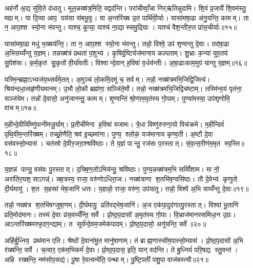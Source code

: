 अह॑र्नो अ॒द्य सु॑वि॒ते द॑धातु। मूल॒न्नख्ष॑त्र॒मिति॒ यद्वद॑न्ति। परा॑चीव्वाँ॒चा निर्‌ऋ॑तिन्नुदामि। शि॒वं प्र॒जायै॑ शि॒वम॑स्तु॒ मह्यम्। या दि॒व्या आप॒ पय॑सा संबभू॒वुः। या अ॒न्तरि॑ख्ष उ॒त पार्थि॑वी॒र्याः। यासा॑मषा॒ढा अ॑नु॒यन्ति॒ कामम्। ता न॒ आप॒श्श स्यो॒ना भ॑वन्तु। याश्च॒ कूप्या॒ याश्च॑ ना॒द्यास्समु॒द्रियाः। याश्च॑ वैश॒न्तीरु॒त प्रा॑स॒चीर्याः॥१५॥

यासा॑मषा॒ढा मधु॑ भ॒ख्षय॑न्ति॒। ता न॒ आप॒श्श स्यो॒ना भ॑वन्तु। तन्नो॒ विश्वे॒ उप॑ शृण्वन्तु दे॒वाः। तद॑षा॒ढा अ॒भिसय्यँ॑न्तु य॒ज्ञम्। तन्नख्ष॑त्रं प्रथतां प॒शुभ्य॑। कृ॒षिर्वृ॒ष्टिर्यज॑मानाय कल्पताम्। शु॒भ्राः क॒न्या॑ युव॒तय॑ सु॒पेश॑सः। क॒र्म॒कृत॑ सु॒कृतो॑ वी॒र्या॑वतीः। विश्वान्दे॒वान् ह॒विषा॑ व॒र्धय॑न्तीः। अ॒षा॒ढाःकाम॒मुप॑ यान्तु य॒ज्ञम्॥१६॥

यस्मि॒न्ब्रह्मा॒ऽभ्यज॑य॒थ्सर्व॑मे॒तत्। अ॒मुञ्च॑ लो॒कमि॒दमू॑ च॒ सर्वम्। तन्नो॒ नख्ष॑त्रमभि॒जिद्वि॒जित्य॑। श्रिय॑न्दधा॒त्वहृ॑णीयमानम्। उ॒भौ लो॒कौ ब्रह्म॑णा॒ सञ्जि॑ते॒मौ। तन्नो॒ नख्ष॑त्रमभि॒जिद्विच॑ष्टाम्। तस्मि॑न्व॒यं पृत॑ना॒ सञ्ज॑येम। तन्नो॑ दे॒वासो॒ अनु॑जानन्तु॒ कामम्। शृ॒ण्वन्ति॑ श्रो॒णाम॒मृत॑स्य गो॒पाम्। पुण्या॑मस्या॒ उप॑शृणोमि॒ वाचम्॥१७॥

म॒हीन्दे॒वीव्विँष्णु॑पत्नीमजू॒र्याम्। प्र॒तीची॑मेना ह॒विषा॑ यजामः। त्रे॒धा विष्णु॑रुरुगा॒यो विच॑क्रमे। म॒हीन्दिवं॑ पृथि॒वीम॒न्तरि॑ख्षम्। तच्छ्रो॒णैति॒ श्रव॑ इ॒च्छमा॑ना। पुण्य॒ श्लोकं॒ यज॑मानाय कृण्व॒ती। अ॒ष्टौ दे॒वा वस॑वस्सो॒म्यास॑। चत॑स्रो दे॒वीर॒जरा॒श्श्रवि॑ष्ठाः। ते य॒ज्ञं पान्तु॒ रज॑सः प॒रस्तात्। सं॒व॒त्स॒रीण॑म॒मृत स्व॒स्ति॥१८॥

य॒ज्ञन्न॑ पान्तु॒ वस॑वः पु॒रस्तात्। द॒ख्षि॒ण॒तो॑ऽभिय॑न्तु॒ श्रवि॑ष्ठाः। पुण्य॒न्नख्ष॑त्रम॒भि सव्विँ॑शाम। मा नो॒ अरा॑तिर॒घश॒साऽगन्न्॑। ख्ष॒त्रस्य॒ राजा॒ वरु॑णोऽधिरा॒जः। नख्ष॑त्राणा श॒तभि॑ष॒ग्वसि॑ष्ठः। तौ दे॒वेभ्य॑ कृणुतो दी॒र्घमायु॑। श॒त स॒हस्रा॑ भेष॒जानि॑ धत्तः। य॒ज्ञन्नो॒ राजा॒ वरु॑ण॒ उप॑यातु। तन्नो॒ विश्वे॑ अ॒भि सय्यँ॑न्तु दे॒वाः॥१९॥

तन्नो॒ नख्ष॑त्र श॒तभि॑षग्जुषा॒णम्। दी॒र्घमायु॒ प्रति॑रद्भेष॒जानि॑। अ॒ज एक॑पा॒दुद॑गात्पु॒रस्तात्। विश्वा॑ भू॒तानि॑ प्रति॒मोद॑मानः। तस्य॑ दे॒वाः प्र॑स॒वय्यँ॑न्ति॒ सर्वे। प्रो॒ष्ठ॒प॒दासो॑ अ॒मृत॑स्य गो॒पाः। वि॒भ्राज॑मानस्समिधा॒न उ॒ग्रः। आऽन्तरि॑ख्षमरुह॒दग॒न्द्याम्। त सूर्य॑न्दे॒वम॒जमेक॑पादम्। प्रो॒ष्ठ॒प॒दासो॒ अनु॑यन्ति॒ सर्वे॥२०॥

अहि॑र्बु॒ध्निय॒ प्रथ॑मान एति। श्रेष्ठो॑ दे॒वाना॑मु॒त मानु॑षाणाम्। तं ब्राह्म॒णास्सो॑म॒पास्सो॒म्यास॑। प्रो॒ष्ठ॒प॒दासो॑ अ॒भि र॑ख्षन्ति॒ सर्वे। च॒त्वार॒ एक॑म॒भिकर्म॑ दे॒वाः। प्रो॒ष्ठ॒प॒दास॒ इति॒ यान् वद॑न्ति। ते बु॒ध्नियं॑ परि॒षद्य स्तु॒वन्त॑। अहि रख्षन्ति॒ नम॑सोप॒सद्य॑। पू॒षा रे॒वत्यन्वे॑ति॒ पन्थाम्। पु॒ष्टि॒पती॑ पशु॒पा वाज॑बस्त्यौ॥२१॥

